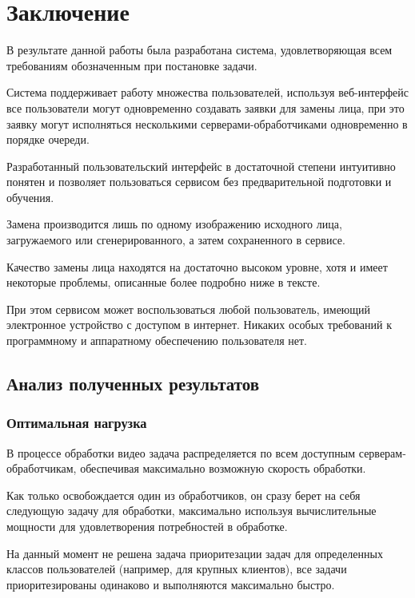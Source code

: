\section{Заключение}

В результате данной работы была разработана система, удовлетворяющая всем требованиям обозначенным при постановке задачи.

Система поддерживает работу множества пользователей, используя веб-интерфейс все пользователи могут одновременно создавать заявки для замены лица, при это заявку могут исполняться несколькими серверами-обработчиками одновременно в порядке очереди.

Разработанный пользовательский интерфейс в достаточной степени интуитивно понятен и позволяет пользоваться сервисом без предварительной подготовки и обучения.

Замена производится лишь по одному изображению исходного лица, загружаемого или сгенерированного, а затем сохраненного в сервисе.

Качество замены лица находятся на достаточно высоком уровне, хотя и имеет некоторые проблемы, описанные более подробно ниже в тексте.

При этом сервисом может воспользоваться любой пользователь, имеющий электронное устройство с доступом в интернет. Никаких особых требований к программному и аппаратному обеспечению пользователя нет.

\subsection{Анализ полученных результатов}

\subsubsection{Оптимальная нагрузка}

В процессе обработки видео задача распределяется по всем доступным серверам-обработчикам, обеспечивая максимально возможную скорость обработки.

Как только освобождается один из обработчиков, он сразу берет на себя следующую задачу для обработки, максимально используя вычислительные мощности для удовлетворения потребностей в обработке.

На данный момент не решена задача приоритезации задач для определенных классов пользователей (например, для крупных клиентов), все задачи приоритезированы одинаково и выполняются максимально быстро.

